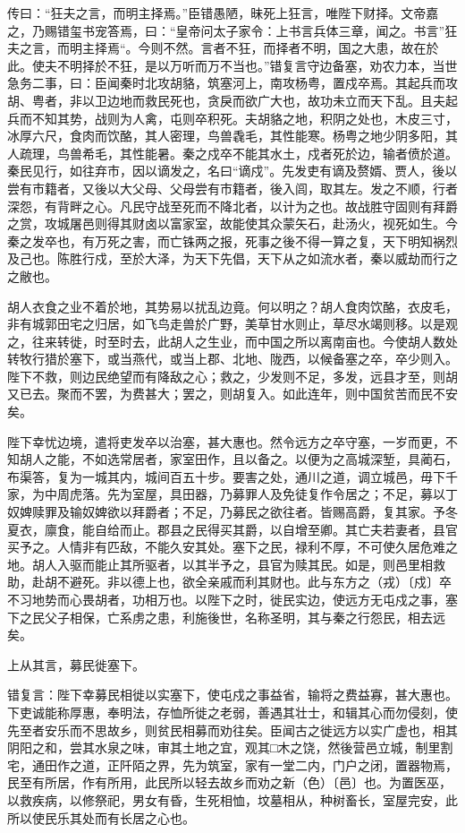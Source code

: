 \documentclass[UTF8,titlepage,oneside]{ctexbook}
\begin{document}
传曰：“狂夫之言，而明主择焉。”臣错愚陋，昧死上狂言，唯陛下财择。文帝嘉之，乃赐错玺书宠答焉，曰：“皇帝问太子家令：上书言兵体三章，闻之。书言”狂夫之言，而明主择焉“。今则不然。言者不狂，而择者不明，国之大患，故在於此。使夫不明择於不狂，是以万听而万不当也。”错复言守边备塞，劝农力本，当世急务二事，曰：臣闻秦时北攻胡貉，筑塞河上，南攻杨粤，置戍卒焉。其起兵而攻胡、粤者，非以卫边地而救民死也，贪戾而欲广大也，故功未立而天下乱。且夫起兵而不知其势，战则为人禽，屯则卒积死。夫胡貉之地，积阴之处也，木皮三寸，冰厚六尺，食肉而饮酪，其人密理，鸟兽毳毛，其性能寒。杨粤之地少阴多阳，其人疏理，鸟兽希毛，其性能暑。秦之戍卒不能其水土，戍者死於边，输者偾於道。秦民见行，如往弃市，因以谪发之，名曰“谪戍”。先发吏有谪及赘婿、贾人，後以尝有市籍者，又後以大父母、父母尝有市籍者，後入闾，取其左。发之不顺，行者深怨，有背畔之心。凡民守战至死而不降北者，以计为之也。故战胜守固则有拜爵之赏，攻城屠邑则得其财卤以富家室，故能使其众蒙矢石，赴汤火，视死如生。今秦之发卒也，有万死之害，而亡铢两之报，死事之後不得一算之复，天下明知祸烈及己也。陈胜行戍，至於大泽，为天下先倡，天下从之如流水者，秦以威劫而行之之敝也。

胡人衣食之业不着於地，其势易以扰乱边竟。何以明之？胡人食肉饮酪，衣皮毛，非有城郭田宅之归居，如飞鸟走兽於广野，美草甘水则止，草尽水竭则移。以是观之，往来转徙，时至时去，此胡人之生业，而中国之所以离南亩也。今使胡人数处转牧行猎於塞下，或当燕代，或当上郡、北地、陇西，以候备塞之卒，卒少则入。陛下不救，则边民绝望而有降敌之心；救之，少发则不足，多发，远县才至，则胡又已去。聚而不罢，为费甚大；罢之，则胡复入。如此连年，则中国贫苦而民不安矣。

陛下幸忧边境，遣将吏发卒以治塞，甚大惠也。然令远方之卒守塞，一岁而更，不知胡人之能，不如选常居者，家室田作，且以备之。以便为之高城深堑，具蔺石，布渠答，复为一城其内，城间百五十步。要害之处，通川之道，调立城邑，毋下千家，为中周虎落。先为室屋，具田器，乃募罪人及免徒复作令居之；不足，募以丁奴婢赎罪及输奴婢欲以拜爵者；不足，乃募民之欲往者。皆赐高爵，复其家。予冬夏衣，廪食，能自给而止。郡县之民得买其爵，以自增至卿。其亡夫若妻者，县官买予之。人情非有匹敌，不能久安其处。塞下之民，禄利不厚，不可使久居危难之地。胡人入驱而能止其所驱者，以其半予之，县官为赎其民。如是，则邑里相救助，赴胡不避死。非以德上也，欲全亲戚而利其财也。此与东方之（戎）〔戍〕卒不习地势而心畏胡者，功相万也。以陛下之时，徙民实边，使远方无屯戍之事，塞下之民父子相保，亡系虏之患，利施後世，名称圣明，其与秦之行怨民，相去远矣。

上从其言，募民徙塞下。

错复言：陛下幸募民相徙以实塞下，使屯戍之事益省，输将之费益寡，甚大惠也。下吏诚能称厚惠，奉明法，存恤所徙之老弱，善遇其壮士，和辑其心而勿侵刻，使先至者安乐而不思故乡，则贫民相募而劝往矣。臣闻古之徙远方以实广虚也，相其阴阳之和，尝其水泉之味，审其土地之宜，观其□木之饶，然後营邑立城，制里割宅，通田作之道，正阡陌之界，先为筑室，家有一堂二内，门户之闭，置器物焉，民至有所居，作有所用，此民所以轻去故乡而劝之新（色）〔邑〕也。为置医巫，以救疾病，以修祭祀，男女有昏，生死相恤，坟墓相从，种树畜长，室屋完安，此所以使民乐其处而有长居之心也。
\end{document}
